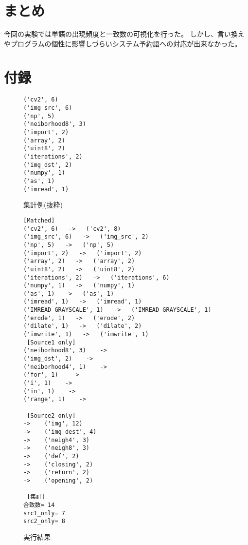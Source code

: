 \documentclass[uplatex]{jsarticle}
\begin{document}
\section{まとめ}
今回の実験では単語の出現頻度と一致数の可視化を行った。
しかし、言い換えやプログラムの個性に影響しづらいシステム予約語への対応が出来なかった。
\section{付録}
\nocite{*}


\begin{figure}[h]
\begin{lstlisting}
('cv2', 6)
('img_src', 6)
('np', 5)
('neiborhood8', 3)
('import', 2)
('array', 2)
('uint8', 2)
('iterations', 2)
('img_dst', 2)
('numpy', 1)
('as', 1)
('imread', 1)
\end{lstlisting}
\caption{集計例(抜粋)}
\label{log1}
\end{figure}

\begin{figure}[h]
\begin{lstlisting}
[Matched]
('cv2', 6)   ->   ('cv2', 8)
('img_src', 6)   ->   ('img_src', 2)
('np', 5)   ->   ('np', 5)
('import', 2)   ->   ('import', 2)
('array', 2)   ->   ('array', 2)
('uint8', 2)   ->   ('uint8', 2)
('iterations', 2)   ->   ('iterations', 6)
('numpy', 1)   ->   ('numpy', 1)
('as', 1)   ->   ('as', 1)
('imread', 1)   ->   ('imread', 1)
('IMREAD_GRAYSCALE', 1)   ->   ('IMREAD_GRAYSCALE', 1)
('erode', 1)   ->   ('erode', 2)
('dilate', 1)   ->   ('dilate', 2)
('imwrite', 1)   ->   ('imwrite', 1)
 [Source1 only]
('neiborhood8', 3)    ->
('img_dst', 2)    ->
('neiborhood4', 1)    ->
('for', 1)    ->
('i', 1)    ->
('in', 1)    ->
('range', 1)    ->

 [Source2 only]
->    ('img', 12)
->    ('img_dest', 4)
->    ('neigh4', 3)
->    ('neigh8', 3)
->    ('def', 2)
->    ('closing', 2)
->    ('return', 2)
->    ('opening', 2)

 [集計]
合致数= 14
src1_only= 7
src2_only= 8
\end{lstlisting}
\caption{実行結果}
\label{log2}
\end{figure}
\end{document}
